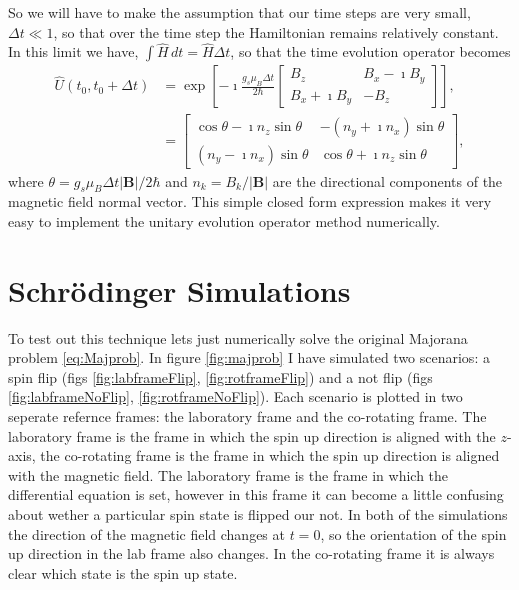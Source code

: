So we will have to make the assumption that our time steps are very small, $\Delta t \ll 1$, so that over the time step the Hamiltonian remains relatively constant.
In this limit we have, $\int\widehat{H}\,dt = \widehat{H}\Delta t$, so that the time evolution operator becomes
\begin{align}
    \widehat{U}(t_0,t_0+\Delta t) &= \exp\left[  -\imath\frac{g_s\mu_B\Delta t}{2 \hbar} \begin{bmatrix} B_z & B_x - \imath B_y \\
                                                      B_x + \imath B_y & -B_z \end{bmatrix} \right],\\
                &= \begin{bmatrix} \cos\theta - \imath n_z \sin\theta & -\left(n_y+\imath n_x\right)\sin\theta \\
                                   \left(n_y-\imath n_x\right)\sin\theta & \cos\theta + \imath n_z \sin\theta\end{bmatrix}, 
\end{align}
where $\theta = g_s \mu_B \Delta t \vert \mathbf{B} \vert / 2\hbar$ and $n_k = B_k / \vert \mathbf{B} \vert$ are the directional components of the magnetic field normal vector.
This simple closed form expression makes it very easy to implement the unitary evolution operator method numerically.


\section{Schr\"odinger Simulations}

To test out this technique lets just numerically solve the original Majorana problem \eqref{eq:Majprob}.
In figure \ref{fig:majprob} I have simulated two scenarios: a spin flip (figs \ref{fig:labframeFlip}, \ref{fig:rotframeFlip}) and a not flip (figs \ref{fig:labframeNoFlip}, \ref{fig:rotframeNoFlip}).
Each scenario is plotted in two seperate refernce frames: the laboratory frame and the co-rotating frame.
The laboratory frame is the frame in which the spin up direction is aligned with the $z$-axis, the co-rotating frame is the frame in which the spin up direction is aligned with the magnetic field.
The laboratory frame is the frame in which the differential equation is set, however in this frame it can become a little confusing about wether a particular spin state is flipped our not.
In both of the simulations the direction of the magnetic field changes at $t=0$, so the orientation of the spin up direction in the lab frame also changes.
In the co-rotating frame it is always clear which state is the spin up state.

